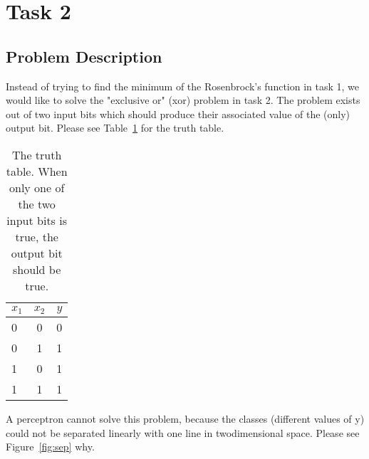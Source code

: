 \documentclass{article}
\begin{document}
\pagestyle{empty}

\def\layersep{3.5cm}

\section{Task 2}

\subsection{Problem Description}
Instead of trying to find the minimum of the Rosenbrock's function in task 1, we would like to solve the "exclusive or" (xor) problem in task 2. The problem exists out of two input bits which should produce their associated value of the (only) output bit. Please see Table~\ref{tab:tt} for the truth table.

\begin{table}[!h]
	\centering
	\begin{tabular}{| l | c | r |}
		\hline
		$x_1$ & $x_2$ & $y$ \\ \hline
		0 & 0 & 0 \\ \hline
		0 & 1 & 1 \\ \hline
		1 & 0 & 1 \\ \hline
		1 & 1 & 1 \\ \hline
	\end{tabular}
	\caption{The truth table. When only one of the two input bits is true, the output bit should be true.}
	\label{tab:tt}
\end{table}

A perceptron cannot solve this problem, because the classes (different values of y) could not be separated linearly with one line in twodimensional space. Please see Figure~\ref{fig:sep} why. 
\end{document}
